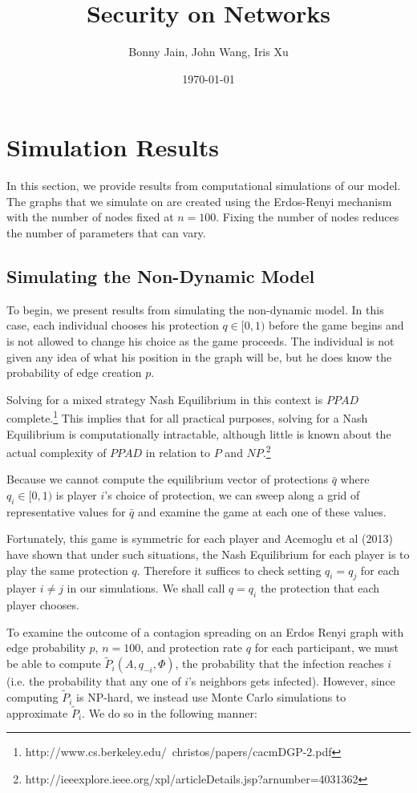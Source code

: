 \documentclass{article}
\title{Security on Networks}
\date{\today}
\author{Bonny Jain, John Wang, Iris Xu}
\theoremstyle{plain}
\begin{document}
  \maketitle

\section{Simulation Results}

In this section, we provide results from computational simulations of our model. The graphs that we simulate on are created using the Erdos-Renyi mechanism with the number of nodes fixed at $n = 100$. Fixing the number of nodes reduces the number of parameters that can vary.

\subsection{Simulating the Non-Dynamic Model}

To begin, we present results from simulating the non-dynamic model. In this case, each individual chooses his protection $q \in [0,1)$ before the game begins and is not allowed to change his choice as the game proceeds. The individual is not given any idea of what his position in the graph will be, but he does know the probability of edge creation $p$.

Solving for a mixed strategy Nash Equilibrium in this context is $PPAD$ complete.\footnote{http://www.cs.berkeley.edu/~christos/papers/cacmDGP-2.pdf} This implies that for all practical purposes, solving for a Nash Equilibrium is computationally intractable, although little is known about the actual complexity of $PPAD$ in relation to $P$ and $NP$.\footnote{http://ieeexplore.ieee.org/xpl/articleDetails.jsp?arnumber=4031362} 

Because we cannot compute the equilibrium vector of protections $\bar{q}$ where $q_i \in [0,1)$ is player $i$'s choice of protection, we can sweep along a grid of representative values for $\bar{q}$ and examine the game at each one of these values.

Fortunately, this game is symmetric for each player and Acemoglu et al (2013) have shown that under such situations, the Nash Equilibrium for each player is to play the same protection $q$. Therefore it suffices to check setting $q_i = q_j$ for each player $i \neq j$ in our simulations. We shall call $q = q_i$ the protection that each player chooses.

To examine the outcome of a contagion spreading on an Erdos Renyi graph with edge probability $p$, $n = 100$, and protection rate $q$ for each participant, we must be able to compute $\tilde{P}_i(A, q_{-i}, \Phi)$, the probability that the infection reaches $i$ (i.e. the probability that any one of $i$'s neighbors gets infected). However, since computing $\tilde{P}_i$ is NP-hard, we instead use Monte Carlo simulations to approximate $\tilde{P}_i$. We do so in the following manner:
\end{document}
